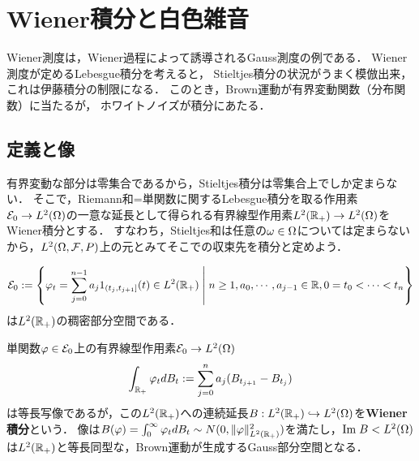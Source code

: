 \documentclass[uplatex,dvipdfmx]{jsreport}
\begin{document}
\section{Wiener積分と白色雑音}\label{sec-Wiener-integral}

\begin{tcolorbox}[colframe=ForestGreen, colback=ForestGreen!10!white,breakable,colbacktitle=ForestGreen!40!white,coltitle=black,fonttitle=\bfseries\sffamily,
    title=]
    Wiener測度は，Wiener過程によって誘導されるGauss測度の例である．
    Wiener測度が定めるLebesgue積分を考えると，
    Stieltjes積分の状況がうまく模倣出来，これは伊藤積分の制限になる．
    このとき，Brown運動が有界変動関数（分布関数）に当たるが，
    ホワイトノイズが積分にあたる．
\end{tcolorbox}

\subsection{定義と像}

\begin{tcolorbox}[colframe=ForestGreen, colback=ForestGreen!10!white,breakable,colbacktitle=ForestGreen!40!white,coltitle=black,fonttitle=\bfseries\sffamily,
title=$\Om$に関する抽象化を施して無限次元積分を定義する]
    有界変動な部分は零集合であるから，Stieltjes積分は零集合上でしか定まらない．
    そこで，Riemann和=単関数に関するLebesgue積分を取る作用素$\mathcal{E}_0\to L^2(\Omega)$の一意な延長として得られる有界線型作用素$L^2(\mathbb{R}_+)\to L^2(\Omega)$をWiener積分とする．
    すなわち，Stieltjes和は任意の$\omega\in\Omega$については定まらないから，$L^2(\Omega,\mathcal{F},P)$上の元とみてそこでの収束先を積分と定めよう．
\end{tcolorbox}

\begin{notation}
    \[\mathcal{E}_0:=\left\{\varphi_t=\sum^{n-1}_{j=0}a_j1_{(t_j,t_{j+1}]}(t)\in L^2(\mathbb{R}_+)\;\middle|\;n\ge 1,a_0,\cdots,a_{j-1}\in\mathbb{R},0=t_0<\cdots<t_n\right\}\]
    は$L^2(\mathbb{R}_+)$の稠密部分空間である．
\end{notation}

\begin{definition}\label{def-Wiener-integral}
    単関数$\varphi\in\mathcal{E}_0$上の有界線型作用素$\mathcal{E}_0\to L^2(\Omega)$
    \[\int_{\mathbb{R}_+}\varphi_tdB_t:=\sum^n_{j=0}a_j(B_{t_{j+1}}-B_{t_j})\]
    は等長写像であるが，この$L^2(\mathbb{R}_+)$への連続延長$B:L^2(\mathbb{R}_+)\hookrightarrow L^2(\Omega)$を\textbf{Wiener積分}という．
    像は$B(\varphi)=\int^\infty_0\varphi_tdB_t\sim N(0,\|\varphi\|^2_{L^2(\mathbb{R}_+)})$を満たし，$\mathrm{Im}\; B<L^2(\Omega)$は$L^2(\mathbb{R}_+)$と等長同型な，Brown運動が生成するGauss部分空間となる．
\end{definition}
\end{document}
